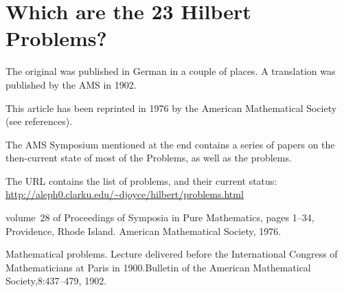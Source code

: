 \section{Which are the 23 Hilbert Problems?}
The original was published in German in a couple of places.  A
translation was published by the AMS in 1902.
%
%

This article has been reprinted in 1976 by the American Mathematical
Society (see references).

The AMS Symposium mentioned at the end contains a series of papers on
the then-current state of most of the Problems, as well as the problems.

The URL contains the list of problems, and their current status:
\url{http://aleph0.clarku.edu/~djoyce/hilbert/problems.html}





    {volume~28 of Proceedings of Symposia in Pure Mathematics,} {pages
    1--34, Providence, Rhode Island. American Mathematical Society,
    1976.}

  {Mathematical problems. Lecture delivered before
    the International Congress of Mathematicians at Paris in
    1900.}{Bulletin of the American Mathematical Society,}{8:437--479,
    1902.}
